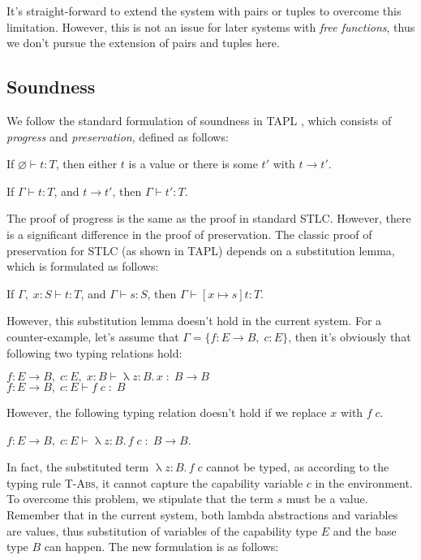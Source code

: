 It's straight-forward to extend the system with pairs or tuples to
overcome this limitation. However, this is not an issue for later
systems with \emph{free functions}, thus we don't pursue the extension
of pairs and tuples here.

\subsection{Soundness}

\label{sec:stlc-pure-soundness}

We follow the standard formulation of soundness in TAPL
\cite{bpierce2002types}, which consists of \emph{progress} and
\emph{preservation}, defined as follows:

\begin{theorem}[Progress]
If $\varnothing \vdash t : T$, then either $t$ is a value or there is some
$t'$ with $t \longrightarrow t'$.
\end{theorem}

\begin{theorem}[Preservation]
If $\Gamma \vdash t : T$, and $t \longrightarrow t'$, then $\Gamma
\vdash t' : T$.
\end{theorem}

The proof of progress is the same as the proof in standard
STLC. However, there is a significant difference in the proof of
preservation. The classic proof of preservation for STLC (as shown in
TAPL) depends on a substitution lemma, which is formulated as follows:

\begin{lemma}
If $\Gamma,\; x:S \vdash t : T$, and $\Gamma \vdash s : S$, then $\Gamma
\vdash [x \mapsto s]t : T$.
\end{lemma}

However, this substitution lemma doesn't hold in the current
system. For a counter-example, let's assume that
$\Gamma = \{f: E \to B,\; c:E\}$, then it's obviously that following
two typing relations hold:

$f: E \to B,\; c:E,\; x:B \vdash \uplambda z{:}B.\,x \; : \; B \to B$ \\
$f: E \to B,\; c:E \vdash f \; c \; : \; B$

However, the following typing relation doesn't hold if we replace $x$
with $f \; c$.

$f: E \to B,\; c:E \vdash \uplambda z{:}B.\,f \; c \; : \; B \to B$.

In fact, the substituted term $\uplambda z{:}B.\,f \; c$ cannot be
typed, as according to the typing rule \textsc{T-Abs}, it cannot
capture the capability variable $c$ in the environment. To overcome
this problem, we stipulate that the term $s$ must be a value. Remember
that in the current system, both lambda abstractions and variables are
values, thus substitution of variables of the capability type $E$ and
the base type $B$ can happen. The new formulation is as follows:

